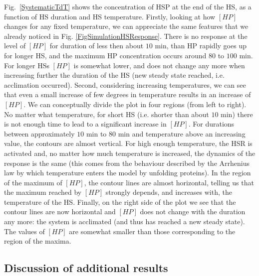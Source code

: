 \documentclass[oneside, 10pt, a4paper, twocolumn]{article}
\begin{document}
Fig.~\ref{SystematicTdT} shows the concentration of HSP at the end of the HS, as a function of HS duration and HS temperature. Firstly, looking at how $\left[HP\right]$ changes for any fixed temperature, we can appreciate the same features that we already noticed in Fig. \ref{FigSimulationHSResponse}. There is no response at the level of $\left[HP\right]$ for duration of less then about $10$ min, than HP rapidly goes up for longer HS, and the maximum HP concentration occurs around $80$ to $100$ min. For longer HSs $\left[HP\right]$ is somewhat lower, and does not change any more when increasing further the duration of the HS (new steady state reached, i.e. acclimation occurred).
Second, considering increasing temperatures, we can see that even a small increase of few degrees in temperature results in an increase of $\left[HP\right]$. %
We can conceptually divide the plot in four regions (from left to right). No matter what temperature, for short HS (i.e. shorter than about $10$ min) there is not enough time to lead to a significant increase in $\left[HP\right]$. For durations between approximately $10$ min to $80$ min and temperature above an increasing value, the contours are almost vertical. For high enough temperature, the HSR is activated and, no matter how much temperature is increased, the dynamics of the response is the same (this comes from the behaviour described by the Arrhenius law  by which temperature enters the model by unfolding proteins). In the region of the maximum of $\left[HP\right]$, the contour lines are almost horizontal, telling us that the maximum reached by $\left[HP\right]$ strongly depends, and increases with, the temperature of the HS. Finally, on the right side of the plot we see that the contour lines are now horizontal and $\left[HP\right]$ does not change with the duration any more: the system is acclimated (and thus has reached a new steady state). The values of $\left[HP\right]$ are somewhat smaller than those corresponding to the region of the maxima.


\subsection{Discussion of additional results}
\end{document}
